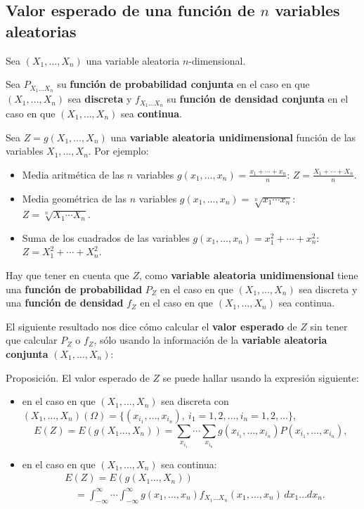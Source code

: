 \documentclass[
  letterpaper,
  DIV=11,
  numbers=noendperiod]{scrreprt}
\providecommand{\tightlist}{%
  \setlength{\itemsep}{0pt}\setlength{\parskip}{0pt}}\usepackage{longtable,booktabs,array}
\begin{document}
\hypertarget{valor-esperado-de-una-funciuxf3n-de-n-variables-aleatorias}{%
\subsection{\texorpdfstring{Valor esperado de una función de \(n\)
variables
aleatorias}{Valor esperado de una función de n variables aleatorias}}\label{valor-esperado-de-una-funciuxf3n-de-n-variables-aleatorias}}

Sea \((X_1,\ldots,X_n)\) una variable aleatoria \(n\)-dimensional.

Sea \(P_{X_1\ldots X_n}\) su \textbf{función de probabilidad conjunta}
en el caso en que \((X_1,\ldots,X_n)\) sea \textbf{discreta} y
\(f_{X_1\ldots X_n}\) su \textbf{función de densidad conjunta} en el
caso en que \((X_1,\ldots,X_n)\) sea \textbf{continua}.

Sea \(Z=g(X_1,\ldots,X_n)\) una \textbf{variable aleatoria
unidimensional} función de las variables \(X_1,\ldots,X_n\). Por
ejemplo:

\begin{itemize}
\tightlist
\item
  Media aritmética de las \(n\) variables
  \(g(x_1,\ldots,x_n)=\frac{x_1+\cdots + x_n}{n}\):
  \(Z=\frac{X_1+\cdots +X_n}{n}\).
\item
  Media geométrica de las \(n\) variables
  \(g(x_1,\ldots,x_n)=\sqrt[n]{x_1\cdots x_n}\):
  \(Z=\sqrt[n]{X_1\cdots X_n}\).
\item
  Suma de los cuadrados de las variables
  \(g(x_1,\ldots,x_n)=x_1^2+\cdots +x_n^2\): \(Z=X_1^2+\cdots +X_n^2\).
\end{itemize}

Hay que tener en cuenta que \(Z\), como \textbf{variable aleatoria
unidimensional} tiene una \textbf{función de probabilidad} \(P_Z\) en el
caso en que \((X_1,\ldots,X_n)\) sea discreta y una \textbf{función de
densidad} \(f_Z\) en el caso en que \((X_1,\ldots,X_n)\) sea continua.

El siguiente resultado nos dice cómo calcular el \textbf{valor esperado}
de \(Z\) sin tener que calcular \(P_Z\) o \(f_Z\), sólo usando la
información de la \textbf{variable aleatoria conjunta}
\((X_1,\ldots,X_n)\):

Proposición. El valor esperado de \(Z\) se puede hallar usando la
expresión siguiente:

\begin{itemize}
\item
  en el caso en que \((X_1,\ldots,X_n)\) sea discreta con
  \((X_1,\ldots,X_n)(\Omega)=\{(x_{i_1},\ldots,x_{i_n}),\ i_1=1,2,\ldots, i_n=1,2,\ldots\}\),
  \[
  E(Z)  = E(g(X_1\ldots,X_n))  =\sum_{x_{i_1}}\cdots\sum_{x_{i_n}}g(x_{i_1},\ldots,x_{i_n})P(x_{i_1},\ldots,x_{i_n}),
  \]
\item
  en el caso en que \((X_1,\ldots,X_n)\) sea continua: \[
  \begin{array}{rl}
  & E(Z)=E(g(X_1\ldots,X_n)) \\ & \quad =\int_{-\infty}^\infty\cdots\int_{-\infty}^\infty g(x_1,\ldots,x_n)f_{X_1\ldots X_n}(x_1,\ldots,x_n)\, dx_1\ldots dx_n.
  \end{array}
  \]
\end{itemize}
\end{document}
